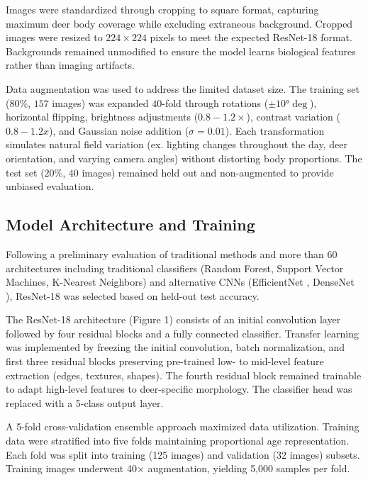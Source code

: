 \documentclass{iopjournal}
\begin{document}
Images were standardized through cropping to square format, capturing maximum deer body coverage while excluding extraneous background. Cropped images were resized to $224\times224$ pixels to meet the expected ResNet-18 format. Backgrounds remained unmodified to ensure the model learns biological features rather than imaging artifacts.

Data augmentation was used to address the limited dataset size. The training set ($80\%$, $157$ images) was expanded $40$-fold through rotations ($\pm10°\deg$), horizontal flipping, brightness adjustments ($0.8-1.2×$), contrast variation ($0.8-1.2x$), and Gaussian noise addition ($\sigma=0.01$). Each transformation simulates natural field variation (ex. lighting changes throughout the day, deer orientation, and varying camera angles) without distorting body proportions. The test set ($20\%$, $40$ images) remained held out and non-augmented to provide unbiased evaluation.

\subsection{Model Architecture and Training}

Following a preliminary evaluation of traditional methods and more than 60 architectures including traditional classifiers (Random Forest, Support Vector Machines, K-Nearest Neighbors) and alternative CNNs (EfficientNet \cite{tan2019efficientnet}, DenseNet \cite{huang2017densely}), ResNet-18 \cite{he2015deep} was selected based on held-out test accuracy.

The ResNet-18 architecture (Figure 1) consists of an initial convolution layer followed by four residual blocks and a fully connected classifier. Transfer learning was implemented by freezing the initial convolution, batch normalization, and first three residual blocks preserving pre-trained low- to mid-level feature extraction (edges, textures, shapes). The fourth residual block remained trainable to adapt high-level features to deer-specific morphology. The classifier head was replaced with a 5-class output layer.

A 5-fold cross-validation ensemble approach maximized data utilization. Training data were stratified into five folds maintaining proportional age representation. Each fold was split into training (125 images) and validation (32 images) subsets. Training images underwent 40× augmentation, yielding 5,000 samples per fold.
\end{document}
